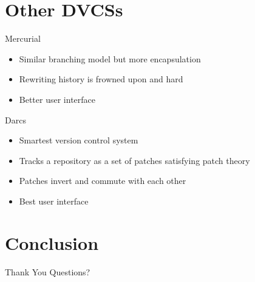 \documentclass{beamer}
\begin{document}
\section{Other DVCSs}

\begin{frame}{Mercurial}
  \begin{itemize}
  \item Similar branching model but more encapsulation
  \item Rewriting history is frowned upon and hard
  \item Better user interface
  \end{itemize}
\end{frame}

\begin{frame}{Darcs}
  \begin{itemize}
  \item Smartest version control system
  \item Tracks a repository as a set of patches satisfying patch theory
  \item Patches invert and commute with each other
  \item Best user interface
  \end{itemize}
\end{frame}

\section{Conclusion}

\begin{frame}{Thank You}
  Questions?
\end{frame}
\end{document}
